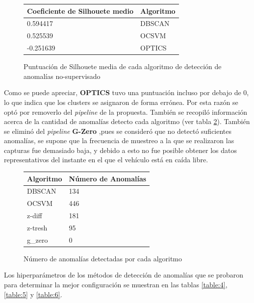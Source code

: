 		\begin{figure}[htb]
			\centering
			\begin{tabular}{ll}
			\toprule
			   Coeficiente de Silhouete medio & Algoritmo \\
			\midrule
			   0.594417 &    DBSCAN \\
			   0.525539 &     OCSVM \\
			  -0.251639 &    OPTICS \\
			\bottomrule
			\end{tabular}
			\caption{Puntuación de Silhouete media de cada algoritmo de detección de anomalías no-supervisado}
			\label{table:2}
		\end{figure}

		Como se puede apreciar, \textbf{OPTICS} tuvo una puntuación incluso por debajo de 0, lo que indica que los clusters se asignaron de 
		forma errónea. Por esta razón se optó por removerlo del \emph{pipeline} de la propuesta. También se recopiló información acerca de la
		cantidad de anomalías detecto cada algoritmo (ver tabla \ref{table:3}). También se eliminó del \emph{pipeline} \textbf{G-Zero}
		,pues se consideró que no detectó suficientes anomalías, se supone que la frecuencia de muestreo a la que se realizaron las capturas
		fue demasiado baja, y debido a esto no fue posible obtener los datos representativos del instante en el que el vehículo está en caída libre.

		\begin{figure}[htb]
			\centering
			\begin{tabular}{ll}
				\toprule
				 Algoritmo &  Número de Anomalías \\
				\midrule
				    DBSCAN &                  134 \\
				     OCSVM &                  446 \\
				    z-diff &                  181 \\
				   z-tresh &                   95 \\
				    g\_zero &                    0 \\
				\bottomrule
			\end{tabular}
			\caption{Número de anomalías detectadas por cada algoritmo}
			\label{table:3}
		\end{figure}

		Los hiperparámetros de los métodos de detección de anomalías que se probaron para determinar la mejor configuración se muestran en las tablas 
		\ref{table:4}, \ref{table:5} y \ref{table:6}.

